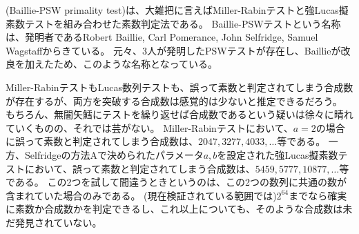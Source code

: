 (Baillie-PSW primality test)は、大雑把に言えばMiller-Rabinテストと強Lucas擬素数テストを組み合わせた素数判定法である。
Baillie-PSWテストという名称は、発明者であるRobert Baillie, Carl Pomerance, John Selfridge, Samuel Wagstaffからきている。
元々、3人が発明したPSWテストが存在し、Baillieが改良を加えたため、このような名称となっている。

Miller-RabinテストもLucas数列テストも、誤って素数と判定されてしまう合成数が存在するが、両方を突破する合成数は感覚的は少ないと推定できるだろう。
もちろん、無闇矢鱈にテストを繰り返せば合成数であるという疑いは徐々に晴れていくものの、それでは芸がない。
Miller-Rabinテストにおいて、$a=2$の場合に誤って素数と判定されてしまう合成数は、$2047, 3277, 4033,\ldots$等である。
一方、Selfridgeの方法Aで決められたパラメータ$a,b$を設定された強Lucas擬素数テストにおいて、誤って素数と判定されてしまう合成数は、$5459, 5777, 10877,\ldots$等である。
この2つを試して間違うときというのは、この2つの数列に共通の数が含まれていた場合のみである。
(現在検証されている範囲では)$2^{64}$までなら確実に素数か合成数かを判定できるし、これ以上についても、そのような合成数は未だ発見されていない。


